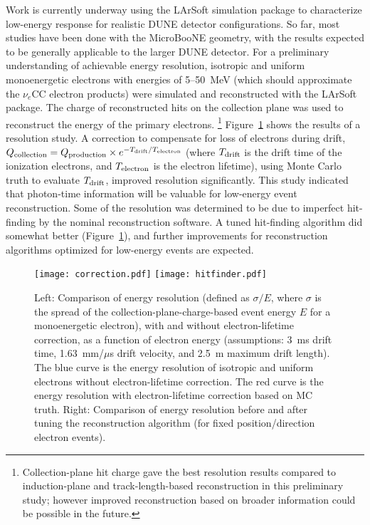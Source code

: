 Work is currently underway using the LArSoft simulation package to
characterize low-energy response for realistic DUNE detector
configurations.
So far, most studies have been done with the MicroBooNE geometry, with
the results expected to be generally applicable to the larger DUNE
detector.  For a preliminary understanding of achievable energy
resolution, isotropic and uniform monoenergetic electrons with
energies of 5--50~MeV (which should approximate the $\nu_e$CC
electron products) were simulated and reconstructed with the LArSoft
package.  The charge of reconstructed hits on the collection plane was
used to reconstruct the energy of the primary electrons.
\footnote{Collection-plane hit charge gave the best resolution results
  compared to induction-plane and track-length-based reconstruction in
  this preliminary study; however improved reconstruction based on
  broader information could be possible in the future.}
Figure~\ref{fig:lowe_res} shows the results of a resolution study.  
A correction to compensate for loss of electrons during
drift, $Q_{\rm collection}=Q_{\rm production}\times e^{-T_{\rm drift} / T_{\rm
    electron}}$ (where $T_{\rm drift}$ is the drift time of the ionization
electrons, and $T_{\rm electron}$ is the electron lifetime), using Monte
Carlo truth to evaluate $T_{\rm drift}$, improved resolution
significantly.  This study indicated that photon-time information will
be valuable for low-energy event reconstruction.  Some of the
resolution was determined to be due to imperfect hit-finding by the
nominal reconstruction software.  A tuned hit-finding algorithm did
somewhat better (Figure~\ref{fig:lowe_res}), and further improvements
for reconstruction algorithms optimized for low-energy events are
expected.
\begin{figure}[!htb] %
 \centering
\texttt{[image: correction.pdf]} 
\texttt{[image: hitfinder.pdf]} 
 \caption[Comparisons of energy resolution]{Left: Comparison of energy
   resolution (defined as $\sigma/E$, where $\sigma$ is the spread of
   the collection-plane-charge-based event energy $E$ for a
   monoenergetic electron), with and without electron-lifetime
   correction, as a function of electron energy (assumptions: 3~ms drift time, 1.63~mm/$\mu$s drift velocity, and 2.5~m maximum drift length). The blue curve is the
   energy resolution of isotropic and uniform electrons without
   electron-lifetime correction. The red curve is the energy
   resolution with electron-lifetime correction based on MC truth.
   Right: Comparison of energy resolution before and after tuning the
   reconstruction algorithm (for fixed position/direction electron
   events).}\label{fig:lowe_res}
\end{figure}

